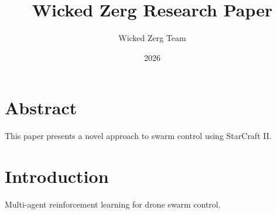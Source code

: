 \documentclass{article}
\title{Wicked Zerg Research Paper}
\author{Wicked Zerg Team}
\date{2026}
\begin{document}
\maketitle

\section{Abstract}
This paper presents a novel approach to swarm control using StarCraft II.

\section{Introduction}
Multi-agent reinforcement learning for drone swarm control.
\end{document}
